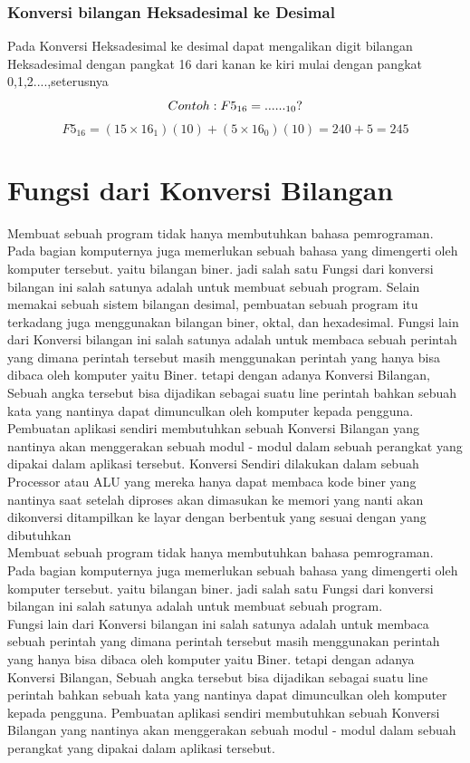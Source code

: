 \subsubsection{Konversi bilangan Heksadesimal ke Desimal}
Pada Konversi Heksadesimal ke desimal dapat mengalikan digit bilangan Heksadesimal dengan pangkat 16 dari kanan ke kiri mulai dengan pangkat 0,1,2....,seterusnya
\begin{equation}
\\Contoh : F5_{16} = ......_{10} ? 
\end{equation}
\break 
\begin{equation}
F5_{16} = (15 \times 16_{1})(10) + (5 \times 16_{0})(10) = 240 + 5 = 245
\end{equation}
\section{Fungsi dari Konversi Bilangan}
Membuat sebuah program tidak hanya membutuhkan bahasa pemrograman. Pada bagian komputernya juga memerlukan sebuah bahasa yang dimengerti oleh komputer tersebut. yaitu bilangan biner. jadi salah satu Fungsi dari konversi bilangan ini salah satunya adalah untuk membuat sebuah program. Selain memakai sebuah sistem bilangan desimal, pembuatan sebuah program itu terkadang juga menggunakan bilangan biner, oktal, dan hexadesimal.
Fungsi lain dari Konversi bilangan ini salah satunya adalah untuk membaca sebuah perintah yang dimana perintah tersebut masih menggunakan perintah yang hanya bisa dibaca oleh komputer yaitu Biner. tetapi dengan adanya Konversi Bilangan, Sebuah angka tersebut bisa dijadikan sebagai suatu line perintah bahkan sebuah kata yang nantinya dapat dimunculkan oleh komputer kepada pengguna. Pembuatan aplikasi sendiri membutuhkan sebuah Konversi Bilangan yang nantinya akan menggerakan sebuah modul - modul dalam sebuah perangkat yang dipakai dalam aplikasi tersebut. 
Konversi Sendiri dilakukan dalam sebuah Processor atau ALU yang mereka hanya dapat membaca kode biner yang nantinya saat setelah diproses akan dimasukan ke memori yang nanti akan dikonversi ditampilkan ke layar dengan berbentuk yang sesuai dengan yang dibutuhkan \cite{noersasongko1996mengrnal}
\\Membuat sebuah program tidak hanya membutuhkan bahasa pemrograman. Pada bagian komputernya juga memerlukan sebuah bahasa yang dimengerti oleh komputer tersebut. yaitu bilangan biner. jadi salah satu Fungsi dari konversi bilangan ini salah satunya adalah untuk membuat sebuah program. 
\\Fungsi lain dari Konversi bilangan ini salah satunya adalah untuk membaca sebuah perintah yang dimana perintah tersebut masih menggunakan perintah yang hanya bisa dibaca oleh komputer yaitu Biner. tetapi dengan adanya Konversi Bilangan, Sebuah angka tersebut bisa dijadikan sebagai suatu line perintah bahkan sebuah kata yang nantinya dapat dimunculkan oleh komputer kepada pengguna. Pembuatan aplikasi sendiri membutuhkan sebuah Konversi Bilangan yang nantinya akan menggerakan sebuah modul - modul dalam sebuah perangkat yang dipakai dalam aplikasi tersebut. 

